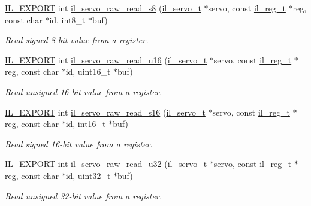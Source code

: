 \begin{DoxyCompactItemize}
\hyperlink{common_8h_a6bb629d26c52bfe10519ba3176853f47}{I\+L\+\_\+\+E\+X\+P\+O\+RT} int \hyperlink{group__IL__SERVO_ga1d6b70bd773328b9cd7e63adcb5fdb24}{il\+\_\+servo\+\_\+raw\+\_\+read\+\_\+s8} (\hyperlink{group__IL__SERVO_ga3369ddfcc33492fe3a28f96cf455b13e}{il\+\_\+servo\+\_\+t} $\ast$servo, const \hyperlink{structil__reg__t}{il\+\_\+reg\+\_\+t} $\ast$reg, const char $\ast$id, int8\+\_\+t $\ast$buf)
\begin{DoxyCompactList}\small\item\em Read signed 8-\/bit value from a register. \end{DoxyCompactList}\item 
\hyperlink{common_8h_a6bb629d26c52bfe10519ba3176853f47}{I\+L\+\_\+\+E\+X\+P\+O\+RT} int \hyperlink{group__IL__SERVO_gae62ff2541783a740d8c2b623e489a703}{il\+\_\+servo\+\_\+raw\+\_\+read\+\_\+u16} (\hyperlink{group__IL__SERVO_ga3369ddfcc33492fe3a28f96cf455b13e}{il\+\_\+servo\+\_\+t} $\ast$servo, const \hyperlink{structil__reg__t}{il\+\_\+reg\+\_\+t} $\ast$reg, const char $\ast$id, uint16\+\_\+t $\ast$buf)
\begin{DoxyCompactList}\small\item\em Read unsigned 16-\/bit value from a register. \end{DoxyCompactList}\item 
\hyperlink{common_8h_a6bb629d26c52bfe10519ba3176853f47}{I\+L\+\_\+\+E\+X\+P\+O\+RT} int \hyperlink{group__IL__SERVO_ga9ac45aa67ec61b0dcbe2827a4484bfd5}{il\+\_\+servo\+\_\+raw\+\_\+read\+\_\+s16} (\hyperlink{group__IL__SERVO_ga3369ddfcc33492fe3a28f96cf455b13e}{il\+\_\+servo\+\_\+t} $\ast$servo, const \hyperlink{structil__reg__t}{il\+\_\+reg\+\_\+t} $\ast$reg, const char $\ast$id, int16\+\_\+t $\ast$buf)
\begin{DoxyCompactList}\small\item\em Read signed 16-\/bit value from a register. \end{DoxyCompactList}\item 
\hyperlink{common_8h_a6bb629d26c52bfe10519ba3176853f47}{I\+L\+\_\+\+E\+X\+P\+O\+RT} int \hyperlink{group__IL__SERVO_ga887a2e63754e1a4ebee5a0ab8310cc56}{il\+\_\+servo\+\_\+raw\+\_\+read\+\_\+u32} (\hyperlink{group__IL__SERVO_ga3369ddfcc33492fe3a28f96cf455b13e}{il\+\_\+servo\+\_\+t} $\ast$servo, const \hyperlink{structil__reg__t}{il\+\_\+reg\+\_\+t} $\ast$reg, const char $\ast$id, uint32\+\_\+t $\ast$buf)
\begin{DoxyCompactList}\small\item\em Read unsigned 32-\/bit value from a register. \end{DoxyCompactList}\item 

\end{DoxyCompactItemize}
